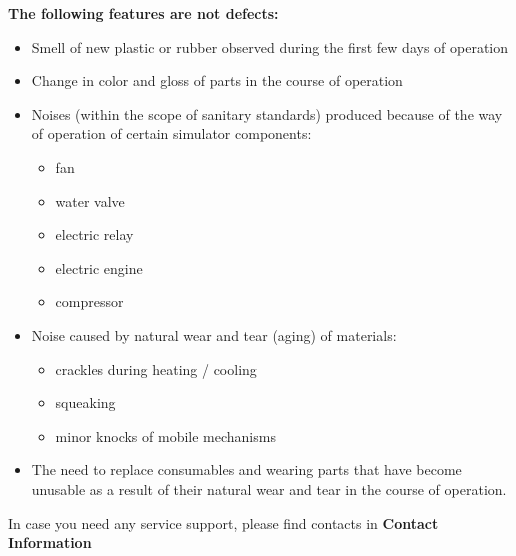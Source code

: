 {    \textbf{The following features are not defects:}
    \begin{itemize}
        \renewcommand{\labelitemi}{\bf--}
        \item Smell of new plastic or rubber observed during the first few days of operation
        \item Change in color and gloss of parts in the course of operation
        \item Noises (within the scope of sanitary standards) produced because of the way of operation of certain simulator components:
        \begin{itemize}
            \item fan
            \item water valve
            \item electric relay
            \item electric engine
            \item compressor     
        \end{itemize}
        \item Noise caused by natural wear and tear (aging) of materials:
        \begin{itemize}
            \item crackles during heating / cooling
            \item squeaking
            \item minor knocks of mobile mechanisms
        \end{itemize}
        
        \item The need to replace consumables and wearing parts that have become unusable as a result of their natural wear and tear in the course of operation. 
    \end{itemize}

    In case you need any service support, please find contacts in \textbf{Contact Information}
    \newpage
}
\fi









